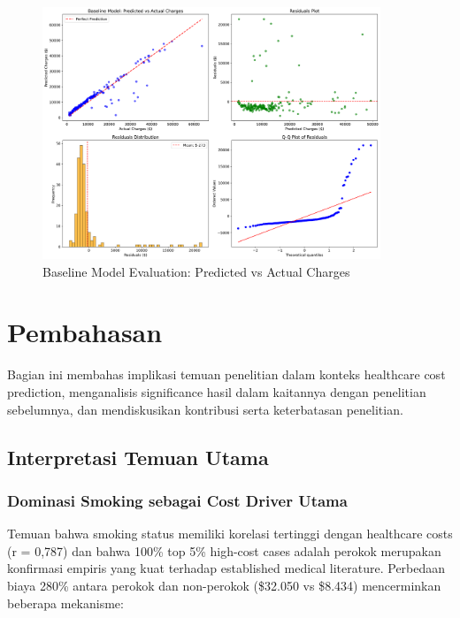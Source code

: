 \begin{figure}[H]
\centering
\includegraphics[width=0.9\textwidth]{../results/plots/09_baseline_model_evaluation.png}
\caption{Baseline Model Evaluation: Predicted vs Actual Charges}
\label{fig:baseline-evaluation}
\end{figure}

\section{Pembahasan}
\label{sec:pembahasan}

Bagian ini membahas implikasi temuan penelitian dalam konteks healthcare cost prediction, menganalisis significance hasil dalam kaitannya dengan penelitian sebelumnya, dan mendiskusikan kontribusi serta keterbatasan penelitian.

\subsection{Interpretasi Temuan Utama}
\label{subsec:interpretasi-temuan}

\subsubsection{Dominasi Smoking sebagai Cost Driver Utama}

Temuan bahwa smoking status memiliki korelasi tertinggi dengan healthcare costs (r = 0,787) dan bahwa 100\% top 5\% high-cost cases adalah perokok merupakan konfirmasi empiris yang kuat terhadap established medical literature. Perbedaan biaya 280\% antara perokok dan non-perokok (\$32.050 vs \$8.434) mencerminkan beberapa mekanisme:

